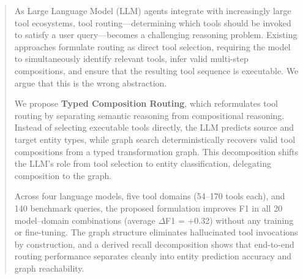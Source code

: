 
\begin{abstract}

As Large Language Model (LLM) agents integrate with increasingly large tool ecosystems, tool routing---determining which tools should be invoked to satisfy a user query---becomes a challenging reasoning problem. Existing approaches formulate routing as direct tool selection, requiring the model to simultaneously identify relevant tools, infer valid multi-step compositions, and ensure that the resulting tool sequence is executable. We argue that this is the wrong abstraction.

We propose \textbf{Typed Composition Routing}, which reformulates tool routing by separating semantic reasoning from compositional reasoning. Instead of selecting executable tools directly, the LLM predicts source and target entity types, while graph search deterministically recovers valid tool compositions from a typed transformation graph. This decomposition shifts the LLM's role from tool selection to entity classification, delegating composition to the graph.

Across four language models, five tool domains (54--170 tools each), and 140 benchmark queries, the proposed formulation improves F1 in all 20 model--domain combinations (average $\Delta$F1 = +0.32) without any training or fine-tuning. The graph structure eliminates hallucinated tool invocations by construction, and a derived recall decomposition shows that end-to-end routing performance separates cleanly into entity prediction accuracy and graph reachability.

\end{abstract}
